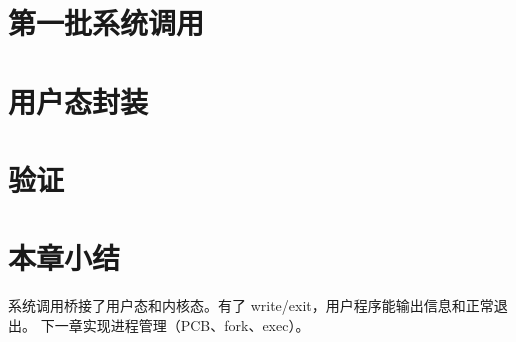 \section{第一批系统调用}


\section{用户态封装}


\section{验证}


\section{本章小结}

系统调用桥接了用户态和内核态。有了 write/exit，用户程序能输出信息和正常退出。
下一章实现进程管理（PCB、fork、exec）。
